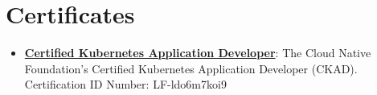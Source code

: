 \documentclass[letterpaper,11pt]{article}
\newcommand{\resumeItem}[2]{
  \item\small{
    \textbf{#1}{: #2 \vspace{-2pt}}
  }
}
\newcommand{\resumeSubItem}[2]{\resumeItem{#1}{#2}\vspace{-4pt}}
\newcommand{\resumeSubHeadingListStart}{\begin{itemize}[leftmargin=*]}
\newcommand{\resumeSubHeadingListEnd}{\end{itemize}}
\begin{document}
 \section{Certificates}
  \resumeSubHeadingListStart
    \resumeSubItem{\href{http://mastergeotech.info/}{Certified Kubernetes Application Developer}}
      {The Cloud Native Foundation's Certified Kubernetes Application Developer (CKAD). Certification ID Number: LF-ldo6m7koi9}
  \resumeSubHeadingListEnd



\end{document}
